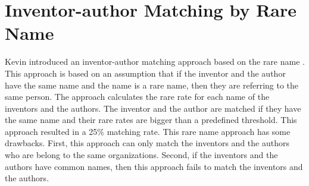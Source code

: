 \section{Inventor-author Matching by Rare Name}
Kevin introduced an inventor-author matching approach based on the rare name \cite{Boyack2008173}. This approach is based on an assumption that if the inventor and the author have the same name and the name is a rare name, then they are referring to the same person. The approach calculates the rare rate for each name of the inventors and the authors. The inventor and the author are matched if they have the same name and their rare rates are bigger than a predefined threshold. This approach resulted in a 25\% matching rate. This rare name approach has some drawbacks. First, this approach can only match the inventors and the authors who are belong to the same organizations. Second, if the inventors and the authors have common names, then this approach fails to match the inventors and the authors.

